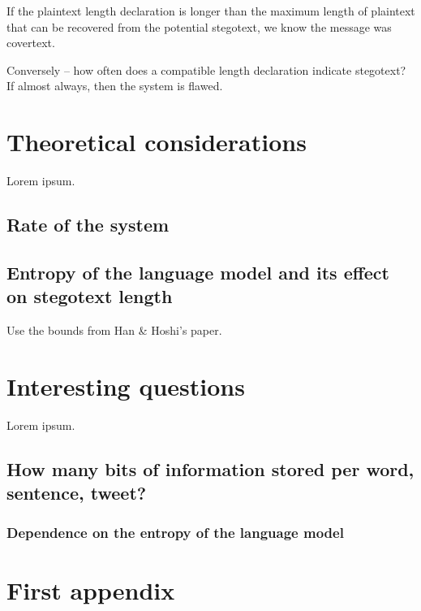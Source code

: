 \documentclass{IIBproject}
\begin{document}
If the plaintext length declaration is longer than the maximum length of plaintext that can be recovered from the potential stegotext, we know the message was covertext.

Conversely -- how often does a compatible length declaration indicate stegotext? If almost always, then the system is flawed.

\section{Theoretical considerations}

Lorem ipsum.

\subsection{Rate of the system}

\subsection{Entropy of the language model and its effect on stegotext length}

Use the bounds from Han \& Hoshi's paper.

\section{Interesting questions}

Lorem ipsum.

\subsection{How many bits of information stored per word, sentence, tweet?}

\subsubsection{Dependence on the entropy of the language model}



\appendix

\section{First appendix}
\end{document}
